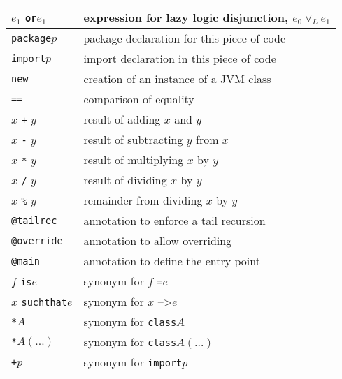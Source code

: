 \documentclass[12pt,a4paper]{book}
\makeatletter
\newcommand{\srccode}[1]{\texttt{{#1}}}
\newcommand{\reservedWord}[1]{{\color{blue}\srccode{#1}}\xspace}
\newcommand{\annotation}[1]{{\color{brown}\srccode{#1}}\xspace}
\newcommand{\sdef}{\srccode{=}\xspace}
\newcommand{\slambda}{{\tiny--\textgreater}\xspace}
\newcommand{\sclass}{\reservedWord{class}}
\newcommand{\sor}{\reservedWord{or}}
\newcommand{\spackage}{\reservedWord{package}}
\newcommand{\simport}{\reservedWord{import}}
\newcommand{\snew}{\reservedWord{new}}
\newcommand{\stailrec}{\annotation{@tailrec}}
\newcommand{\soverride}{\annotation{@override}}
\newcommand{\smain}{\annotation{@main}}
\newcommand{\sequalsSign}{\srccode{==}}
\newcommand{\sasterisk}{\srccode{*}}
\newcommand{\splus}{\srccode{+}}
\newcommand{\sis}{\reservedWord{is}}
\newcommand{\ssuchthat}{\reservedWord{suchthat}}
\makeatother
\begin{document}
\begin{tabular}{ll}
        $e_{1}$ \sor $e_{1}$                           & expression for lazy logic disjunction, $e_{0} \lor _{L} e_{1}$                \\
        \hline
        \spackage $p$                                  & package declaration for this piece of code                                    \\
        \simport $p$                                   & import declaration in this piece of code                                      \\
        \snew                                          & creation of an instance of a JVM class                                        \\
        \hline
        \sequalsSign                                   & comparison of equality                                                        \\
        $x$ \srccode{+} $y$                            & result of adding $x$ and $y$                                                  \\
        $x$ \srccode{-} $y$                            & result of subtracting $y$ from $x$                                            \\
        $x$ \srccode{*} $y$                            & result of multiplying $x$ by $y$                                              \\
        $x$ \srccode{/} $y$                            & result of dividing $x$ by $y$                                                 \\
        $x$ \srccode{\%} $y$                           & remainder from dividing $x$ by $y$                                            \\
        \hline
        \stailrec                                      & annotation to enforce a tail recursion                                        \\
        \soverride                                     & annotation to allow overriding                                                \\
        \smain                                         & annotation to define the entry point                                          \\
        \hline
        $f$ \sis $e$                                   & synonym for $f$ \sdef $e$                                                     \\
        $x$ \ssuchthat $e$                             & synonym for $x$ \slambda $e$                                                  \\
        \sasterisk $A$                                 & synonym for \sclass $A$                                                       \\
        \sasterisk $A(\ldots)$                         & synonym for \sclass $A(\ldots)$                                               \\
        \splus $p$                                     & synonym for \simport $p$                                                      \\
        \hline
    \end{tabular}
\end{document}
